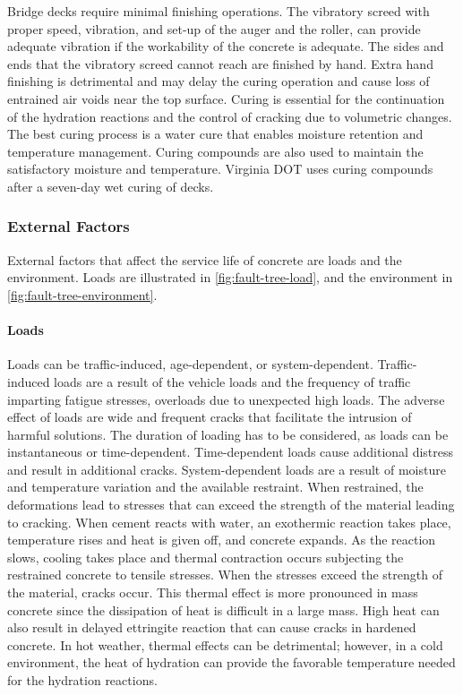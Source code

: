 Bridge decks require minimal finishing operations. The vibratory screed with proper speed, vibration, and set-up of the auger and the roller, can provide adequate vibration if the workability of the concrete is adequate. The sides and ends that the vibratory screed cannot reach are finished by hand. Extra hand finishing is detrimental and may delay the curing operation and cause loss of entrained air voids near the top surface. Curing is essential for the continuation of the hydration reactions and the control of cracking due to volumetric changes. The best curing process is a water cure that enables moisture retention and temperature management. Curing compounds are also used to maintain the satisfactory moisture and temperature. Virginia DOT uses curing compounds after a seven-day wet curing of decks.


\subsubsection{External Factors}
External factors that affect the service life of concrete are loads and the environment. Loads are illustrated in \cref{fig:fault-tree-load}, and the environment in \cref{fig:fault-tree-environment}.

\paragraph{Loads}
Loads can be traffic-induced, age-dependent, or system-dependent. Traffic-induced loads are a result of the vehicle loads and the frequency of traffic imparting fatigue stresses, overloads due to unexpected high loads. The adverse effect of loads are wide and frequent cracks that facilitate the intrusion of harmful solutions. The duration of loading has to be considered, as loads can be instantaneous or time-dependent. Time-dependent loads cause additional distress and result in additional cracks. System-dependent loads are a result of moisture and temperature variation and the available restraint. When restrained, the deformations lead to stresses that can exceed the strength of the material leading to cracking. When cement reacts with water, an exothermic reaction takes place, temperature rises and heat is given off, and concrete expands. As the reaction slows, cooling takes place and thermal contraction occurs subjecting the restrained concrete to tensile stresses. When the stresses exceed the strength of the material, cracks occur. This thermal effect is more pronounced in mass concrete since the dissipation of heat is difficult in a large mass. High heat can also result in delayed ettringite reaction that can cause cracks in hardened concrete. In hot weather, thermal effects can be detrimental; however, in a cold environment, the heat of hydration can provide the favorable temperature needed for the hydration reactions.

